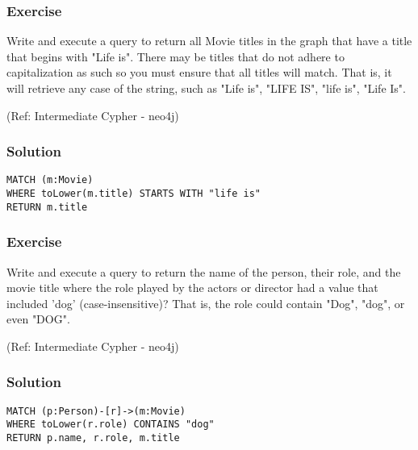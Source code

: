 \begin{frame}[fragile]\frametitle{Exercise}

Write and execute a query to return all Movie titles in the graph that have a title that begins with "Life is". There may be titles that do not adhere to capitalization as such so you must ensure that all titles will match. That is, it will retrieve any case of the string, such as "Life is", "LIFE IS", "life is", "Life Is".

{\tiny (Ref: Intermediate Cypher - neo4j)}

\end{frame}

\begin{frame}[fragile]\frametitle{Solution}

\begin{lstlisting}
MATCH (m:Movie)
WHERE toLower(m.title) STARTS WITH "life is"
RETURN m.title
\end{lstlisting}	

\end{frame}

\begin{frame}[fragile]\frametitle{Exercise}

Write and execute a query to return the name of the person, their role, and the movie title where the role played by the actors or director had a value that included 'dog' (case-insensitive)? That is, the role could contain "Dog", "dog", or even "DOG".

{\tiny (Ref: Intermediate Cypher - neo4j)}

\end{frame}

\begin{frame}[fragile]\frametitle{Solution}

\begin{lstlisting}
MATCH (p:Person)-[r]->(m:Movie)
WHERE toLower(r.role) CONTAINS "dog"
RETURN p.name, r.role, m.title
\end{lstlisting}	

\end{frame}

